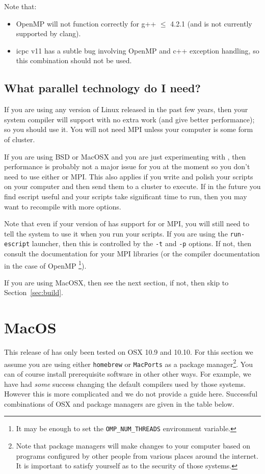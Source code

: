 Note that:
\begin{itemize}
 \item OpenMP will not function correctly for g++ $\leq$ 4.2.1 (and is not currently supported by clang).
 \item icpc v11 has a subtle bug involving OpenMP and c++ exception handling, so this combination should not be used.
\end{itemize}

\subsection{What parallel technology do I need?}\label{sec:needpar}
If you are using any version of Linux released in the past few years, then your system compiler will support 
\openmp with no extra work (and give better performance); so you should use it.
You will not need MPI unless your computer is some form of cluster.

If you are using BSD or MacOSX and you are just experimenting with \escript, then performance is
probably not a major issue for you at the moment so you don't need to use either \openmp or MPI. 
This also applies if you write and polish your scripts on your computer and then send them to a cluster to execute.
If in the future you find escript useful and your scripts take significant time to run, then you may want to recompile 
\escript with more options.



Note that even if your version of \escript has support for \openmp or MPI, you will still need to tell the system to 
use it when you run your scripts.
If you are using the \texttt{run-escript} launcher, then this is controlled  by the \texttt{-t} and \texttt{-p} options.
If not, then consult the documentation for your MPI libraries (or the compiler documentation in the case of OpenMP
\footnote{It may be enough to set the \texttt{OMP\_NUM\_THREADS} environment variable.}).

If you are using MacOSX, then see the next section, if not, then skip to Section~\ref{sec:build}.

\section{MacOS}
This release of \escript has only been tested on OSX 10.9 and 10.10.
For this section we assume you are using either \texttt{homebrew} or \texttt{MacPorts} as a package 
manager\footnote{Note that package managers will make changes to your computer based on programs configured by other people from 
various places around the internet. It is important to satisfy yourself as to the security of those systems.}.
You can of course install prerequisite software in other other ways.
For example, we have had \emph{some} success changing the default 
compilers used by those systems. However this is more complicated and we do not provide a guide here.
Successful combinations of OSX and package managers are given in the table below.

